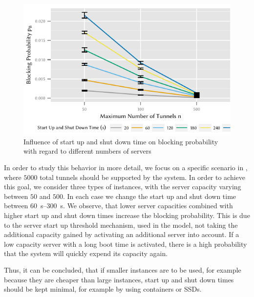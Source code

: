 \begin{figure}
  \centering
  \includegraphics{cloud/virtualized_network_functions/performance_evaluation/figures/compare_maxinstances_block}
  \caption{Influence of start up and shut down time on blocking probability with regard to different numbers of servers}
  \label{fig:cloud_virtualized_network_functions:startup_shutdown:compare_maxinstances_block}
\end{figure}
 
In order to study this behavior in more detail, we focus on a specific scenario in , where \(5000\) total tunnels should be supported by the system.
In order to achieve this goal, we consider three types of instances, with the server capacity varying between \(50\) and \(500\).
In each case we change the start up and shut down time between \SIrange{60}{300}{\second}.
We observe, that lower server capacities combined with higher start up and shut down times increase the blocking probability.
This is due to the server start up threshold mechanism, used in the model, not taking the additional capacity gained by activating an additional server into account.
If a low capacity server with a long boot time is activated, there is a high probability that the system will quickly expend its capacity again.

Thus, it can be concluded, that if smaller instances are to be used, for example because they are cheaper than large instances, start up and shut down times should be kept minimal, for example by using containers or \glspl{SSD}.